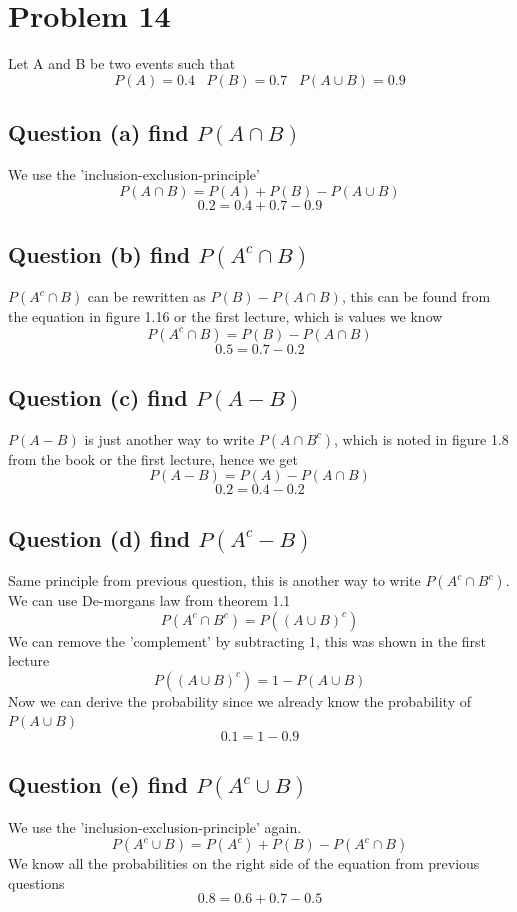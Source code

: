 \documentclass[12pt]{article}
\begin{document}
\section*{Problem 14}
Let A and B be two events such that
\[
P(A) = 0.4 \;\;\; P(B) = 0.7 \;\;\; P(A \cup B) = 0.9 
\]

\subsection*{Question (a) find $P(A \cap B)$}
We use the 'inclusion-exclusion-principle' 
\[
P(A\cap B) = P(A) + P(B) - P(A \cup B)
\]
\[
0.2 = 0.4 + 0.7 - 0.9
\]

\subsection*{Question (b) find $P(A^c \cap B)$}
$P(A^c \cap B)$ can be rewritten as $P(B) - P(A \cap B)$, this can be found from 
the equation in figure 1.16 or the first lecture, which is values we know
\[
P(A^c \cap B) = P(B) - P(A \cap B)
 \]
 \[
 0.5 = 0.7 - 0.2
 \]


\subsection*{Question (c) find $P(A -B)$}
$P(A - B)$ is just another way to write $P(A \cap B^c)$, which is noted in figure 1.8 from the book or the first lecture, 
hence we get
\[
P(A-B) = P(A) - P(A\cap B)
\]
\[
0.2 = 0.4 - 0.2
\]

\subsection*{Question (d) find $P(A^c - B)$}
Same principle from previous question, this is another way to write $P(A^c \cap B^c)$.\\
We can use De-morgans law from theorem 1.1 \cite{STAT}
\[
P(A^c \cap B^c) = P((A\cup B)^c) 
\]
We can remove the 'complement' by subtracting 1, this was shown in the first lecture
\[
P((A\cup B)^c) = 1- P(A \cup B)
\]
Now we can derive the probability since we already know the probability of $P(A \cup B)$
\[
0.1 = 1- 0.9
\]

\subsection*{Question (e) find $P(A^c \cup B)$}
We use the 'inclusion-exclusion-principle' again.
\[
P(A^c \cup B) = P(A^c) + P(B) - P(A^c \cap B)
\]
We know all the probabilities on the right side of the equation from previous questions
\[
0.8 = 0.6 + 0.7 - 0.5
\]
\end{document}
